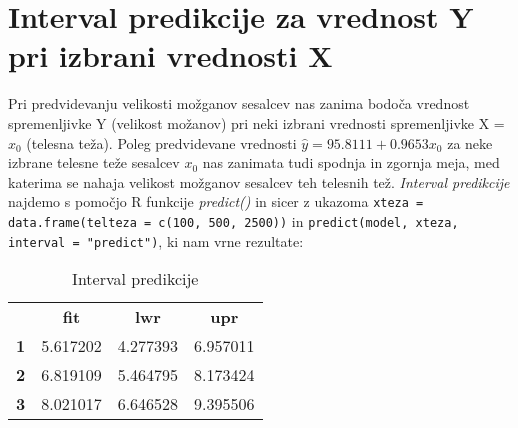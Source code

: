 \section{Interval predikcije za vrednost Y pri izbrani vrednosti X}

Pri predvidevanju velikosti možganov sesalcev nas zanima bodoča vrednost spremenljivke Y (velikost možanov)
pri neki izbrani vrednosti spremenljivke X = $x_0$ (telesna teža).
Poleg predvidevane vrednosti $\widehat{y} = 95.8111 + 0.9653x_0$ za neke izbrane telesne teže sesalcev $x_0$ nas
zanimata tudi spodnja in zgornja meja, med katerima se nahaja velikost možganov sesalcev teh telesnih tež.
\emph{Interval predikcije} najdemo s pomočjo R funkcije \emph{predict()} in sicer z ukazoma
\verb|xteza = data.frame(telteza = c(100, 500, 2500))| in \verb|predict(model, xteza, interval = "predict")|,
ki nam vrne rezultate:

\begin{table}[h]
    \centering
    \begin{tabular}{cccc}
               & \textbf{fit} & \textbf{lwr} & \textbf{upr} \\
    \textbf{1} & 5.617202     & 4.277393     & 6.957011     \\
    \textbf{2} & 6.819109     & 5.464795     & 8.173424     \\
    \textbf{3} & 8.021017     & 6.646528     & 9.395506    
    \end{tabular}
    \caption{Interval predikcije}
    \label{tab:prediction}
\end{table}